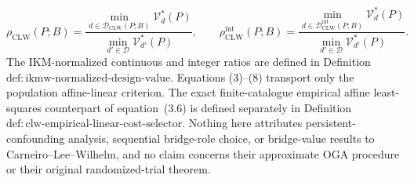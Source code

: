 \[
 \rho_{\mathrm{CLW}}(P;B)=
 \frac{\min_{d\in\mathcal D_{\mathrm{CLW}}(P;B)}\mathcal V_d^*(P)}
 {\min_{d'\in\mathcal D}\mathcal V_{d'}^*(P)},
 \qquad
 \rho_{\mathrm{CLW}}^{\mathrm{int}}(P;B)=
 \frac{\min_{d\in\mathcal D_{\mathrm{CLW}}^{\mathrm{int}}(P;B)}\mathcal V_d^*(P)}
 {\min_{d'\in\mathcal D}\mathcal V_{d'}^*(P)}.             \tag{8}
\]
The IKM-normalized continuous and integer ratios are defined in Definition~\(\mathrm{def{:}ikmw\text{-}normalized\text{-}design\text{-}value}\).  Equations (3)--(8) transport only the population affine-linear criterion.  The exact finite-catalogue empirical affine least-squares counterpart of equation~(3.6) is defined separately in Definition~\(\mathrm{def{:}clw\text{-}empirical\text{-}linear\text{-}cost\text{-}selector}\).  Nothing here attributes persistent-confounding analysis, sequential bridge-role choice, or bridge-value results to Carneiro--Lee--Wilhelm, and no claim concerns their approximate OGA procedure or their original randomized-trial theorem.